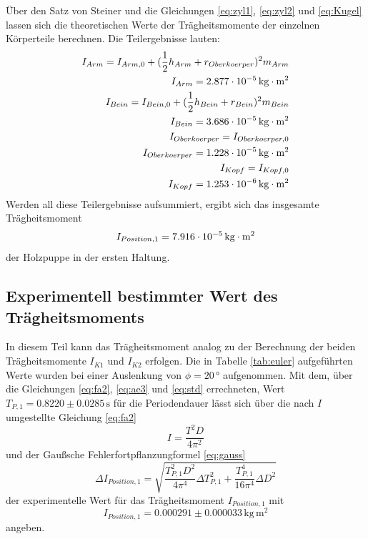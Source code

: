Über den Satz von Steiner und die Gleichungen \ref{eq:zyl1}, \ref{eq:zyl2} und \ref{eq:Kugel} 
lassen sich die theoretischen Werte der Trägheitsmomente der einzelnen
Körperteile berechnen. Die Teilergebnisse lauten:
\begin{align}
    I_{Arm} = I_{Arm,0} + (\frac{1}{2} h_{Arm}+r_{Oberkoerper})^2 m_{Arm} \nonumber \\
    I_{Arm} = 2.877 \cdot 10^{-5}\,\si[inter-unit-product=\cdot]{\kilo\gram\meter\squared} \nonumber \\
    I_{Bein} = I_{Bein,0} + (\frac{1}{2} h_{Bein}+r_{Bein})^2 m_{Bein} \nonumber \\
    I_{Bein} = 3.686 \cdot 10^{-5}\,\si[inter-unit-product=\cdot]{\kilo\gram\meter\squared} \nonumber \\
    I_{Oberkoerper} = I_{Oberkoerper,0}\nonumber \\
    I_{Oberkoerper} = 1.228 \cdot 10^{-5}\,\si[inter-unit-product=\cdot]{\kilo\gram\meter\squared} \nonumber \\
    I_{Kopf} = I_{Kopf,0}\nonumber \\
    I_{Kopf} = 1.253 \cdot 10^{-6}\,\si[inter-unit-product=\cdot]{\kilo\gram\meter\squared} \nonumber \\
\end{align}
\noindent
Werden all diese Teilergebnisse aufsummiert, ergibt sich das insgesamte Trägheitsmoment 
\begin{equation}
    I_{Position,1} = 7.916 \cdot 10^{-5}\,\si[inter-unit-product=\cdot]{\kilo\gram\meter\squared}
\end{equation}
der Holzpuppe in der ersten
Haltung.


\subsection{Experimentell bestimmter Wert des Trägheitsmoments}

In diesem Teil kann das Trägheitsmoment analog zu der Berechnung der beiden Trägheitsmomente $I_{K1}$
und $I_{K2}$ erfolgen. 
Die in Tabelle \ref{tab:euler} aufgeführten Werte wurden bei einer 
Auslenkung von $\phi = 20\,°$ aufgenommen. Mit dem, über die Gleichungen \ref{eq:fa2}, \ref{eq:ae3} 
und \ref{eq:std} errechneten, 
Wert $T_{P,1} = 0.8220 \pm 0.0285\, \si{\second}$
für die Periodendauer lässt sich über die nach $I$ umgestellte Gleichung \ref{eq:fa2}
\begin{equation}
    I = \frac{T^2 D}{4 \pi^2}
\end{equation}
und der Gaußsche Fehlerfortpflanzungformel \ref{eq:gauss}
\begin{equation} 
    \Delta I_{Position,1} = \sqrt{\frac{T_{P,1}^2 D^2}{4 \pi^4}\Delta T_{P,1}^2 + \frac{T_{P,1}^4}{16 \pi^4}\Delta D^2} 
\end{equation}
\noindent
der experimentelle Wert für das Trägheitsmoment $I_{Position,1}$ mit
\begin{equation}
    I_{Position,1} = 0.000291 \pm 0.000033\, \si{\kilogram}\,\si{\meter\squared}
\end{equation}
\noindent
angeben.


